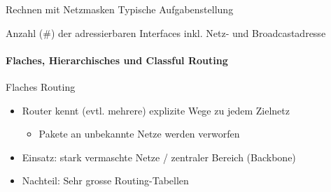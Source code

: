 \begin{KR}{Rechnen mit Netzmasken}
    Typische Aufgabenstellung

    \vspace{1mm}


    \vspace{1mm}

    {\footnotesize Anzahl ($\#$) der adressierbaren Interfaces inkl. Netz- und Broadcastadresse}
\end{KR}

\paragraph{Flaches{,} Hierarchisches und Classful Routing}

\begin{concept}{Flaches Routing}
    \begin{itemize}
        \item Router kennt (evtl. mehrere) explizite Wege zu jedem Zielnetz
        \begin{itemize}
            \item Pakete an unbekannte Netze werden verworfen
        \end{itemize}
        \item Einsatz: stark vermaschte Netze / zentraler Bereich (Backbone)
        \item Nachteil: Sehr grosse Routing-Tabellen
    \end{itemize}
\end{concept}

